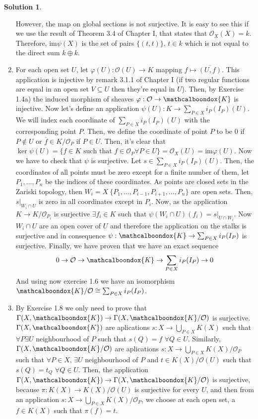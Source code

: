 \documentclass[12pt]{article}
\newcommand{\ima}{\ensuremath{\mathrm{im}}}
\newcommand{\locO}{\ensuremath{\mathcal{O}}}
\theoremstyle{definition}
\newtheorem*{sol}{Solution}
\begin{document}
\begin{sol}
\begin{enumerate}[label = \alph*)]
		However, the map on global sections is not surjective. It is easy to see this if we use the result of Theorem 3.4 of Chapter I, that states that $\locO_X(X) = k$. Therefore, $\ima \psi(X)$ is the set of pairs $\{(t,t)\}, \, t \in k$ which is not equal to the direct sum $k \oplus k$.

		\item For each open set $U$, let $\varphi(U): \locO(U) \to K$ mapping $f \mapsto \overline{(U,f)}$. This application is injective by remark 3.1.1 of Chapter I (if two regular functions are equal in an open set $V \subseteq U$ then they're equal in $U$). Then, by Exercise 1.4a) the induced morphism of sheaves $\varphi: \locO \to \mathcalboondox{K}$ is injective. Now let's define an application $\psi(U): K \to \sum_{P \in X} i_P(I_P)(U)$. We will index each coordinate of $\sum_{P \in X} i_P(I_P)(U)$ with the corresponding point $P$. Then, we define the coordinate of point $P$ to be 0 if $P \notin U$ or $\overline{f} \in K/\locO_P$ if $P \in U$. Then, it's clear that $\ker \psi(U) = \{f \in K \text{ such that } f \in \locO_P \forall P \in U\} = \locO_X(U)= \ima \varphi(U)$. Now we have to check that $\psi$ is surjective. Let $s \in \sum_{P \in X} i_P(I_P) (U)$. Then, the coordinates of all points must be zero except for a finite number of them, let $P_1, \dots, P_n$ be the indices of these coordinates. As points are closed sets in the Zariski topology, then $W_i = X \ \{P_1, \dots, P_{i-1}, P_{i+1}, \dots, P_n \}$ are open sets. Then, $s|_{W_i \cap U}$ is zero in all coordinates except in $P_i$. Now, as the application $K \to K/\locO_{P_i}$ is surjective $\exists f_i \in K$ such that $\psi(W_i \cap U)(f_i) = s|_{U \cap W_i}$. Now $W_i \cap U$ are an open cover of $U$ and therefore the application on the stalks is surjective and in consequence $\psi: \mathcalboondox{K} \to \sum_{P \in X} i_P(I_P)$ is surjective. Finally, we have proven that we have an exact sequence 
		\[
			0 \to \locO \to \mathcalboondox{K} \to \sum_{P \in X}i_P(I_P) \to 0
		\]
		And using now exercise 1.6 we have an isomorphism $\mathcalboondox{K}/\locO \cong \sum_{P \in X}i_P(I_P)$.

		\item By Exercise 1.8 we only need to prove that $\Gamma(X, \mathcalboondox{K}) \to \Gamma(X, \mathcalboondox{K}/\locO)$ is surjective. $\Gamma(X, \mathcalboondox{K})$ are aplications $s: X \to \bigcup_{P \in X} K(X)$ such that $\forall P \exists U$ neighbourhood of $P$ such that $s(Q) = f$ $\forall Q \in U$. Similarly, $\Gamma(X, \mathcalboondox{K}/\locO)$ are aplications $s: X \to \bigcup_{P \in X} K(X)/\locO_P$ such that $\forall P \in X, \, \exists U$ neighbourhood of $P$ and $t \in K(X)/\locO(U)$ such that $s(Q) = t_Q$ $\forall Q \in U$. Then, the application $\Gamma(X, \mathcalboondox{K}) \to \Gamma(X, \mathcalboondox{K}/\locO)$ is surjective, because $\pi: K(X) \to K(X)/\locO(U)$ is surjective for every $U$, and then from an application $s: X \to \bigcup_{P \in X} K(X)/\locO_P$, we choose at each open set, a $f \in K(X)$ such that $\pi(f) = t$.
	\end{enumerate}
\end{sol}
\end{document}
